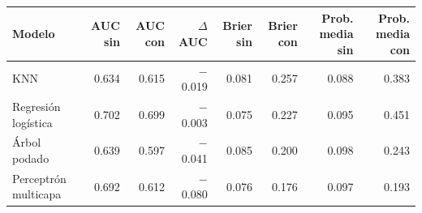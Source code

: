 \begin{tabular}{lrrrrrrr}
\toprule
Modelo & AUC sin & AUC con & $\Delta$ AUC & Brier sin & Brier con & Prob. media sin & Prob. media con \\
\midrule
KNN & 0.634 & 0.615 & $-$0.019 & 0.081 & 0.257 & 0.088 & 0.383 \\
Regresión logística & 0.702 & 0.699 & $-$0.003 & 0.075 & 0.227 & 0.095 & 0.451 \\
Árbol podado & 0.639 & 0.597 & $-$0.041 & 0.085 & 0.200 & 0.098 & 0.243 \\
Perceptrón multicapa & 0.692 & 0.612 & $-$0.080 & 0.076 & 0.176 & 0.097 & 0.193 \\
\bottomrule
\end{tabular}
